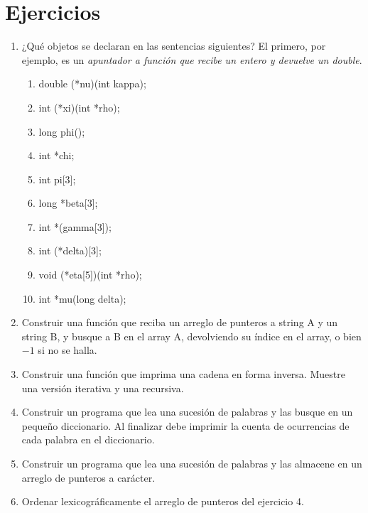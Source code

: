 
\section{Ejercicios}
\label{sec:tc-punteros-ej}
\begin{enumerate}

\item ¿Qué objetos se declaran en las sentencias siguientes? El primero, por ejemplo, es un \textit{apuntador a función que recibe un entero y devuelve un double}.
\begin{enumerate}[label=\alph*.]
	\item double (*nu)(int kappa);
	\item int (*xi)(int *rho);
	\item long phi();
	\item int *chi;
	\item int pi[3];
	\item long *beta[3];
	\item int *(gamma[3]);
	\item int (*delta)[3];
	\item void (*eta[5])(int *rho);
	\item int *mu(long delta);
\end{enumerate}

\item Construir una función que reciba un arreglo de punteros a string A y un
string B, y busque a B en el array A, devolviendo su índice en el array, o bien
$-1$ si no se halla.
\item Construir una función que imprima una cadena en forma inversa.
Muestre una versión iterativa y una recursiva.
\item Construir un programa que lea una sucesión de palabras y las busque en un
pequeño diccionario. Al finalizar debe imprimir la cuenta de ocurrencias de
cada palabra en el diccionario.
\item Construir un programa que lea una sucesión de palabras y las almacene en un
arreglo de punteros a carácter.
\item Ordenar lexicográficamente el arreglo de punteros del ejercicio 4.
\end{enumerate}

